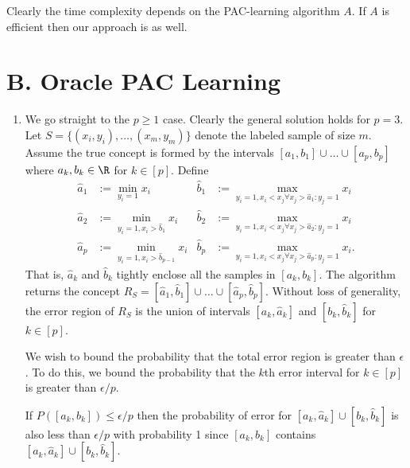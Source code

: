 Clearly the time complexity depends on the PAC-learning
algorithm $A$.
If $A$ is efficient then our approach is as well.

\medskip
\section*{B. Oracle PAC Learning}
\medskip

\begin{enumerate}
    \item We go straight to the $p\geq 1$ case.
    Clearly the general solution holds for $p=3$.
    Let $S=\{(x_i,y_i), \dots, (x_m,y_m)\}$
    denote the labeled sample of size $m$.
    Assume the true concept is formed
    by the intervals 
    $[a_1,b_1] \cup \dots \cup [a_p, b_p]$
    where $a_k, b_k \in \R$ for $k \in [p]$.
    Define
    \begin{align}
        \hat{a}_1 &:= \min_{y_i=1} x_i
        & 
        \hat{b}_1 &:= \max_
        {y_i=1, x_i < x_j \forall x_j > \hat{a}_1 : y_j=1} x_i
        \nonumber \\
        \hat{a}_2 &:= \min_{y_i=1, x_i > \hat{b}_1} x_i
        &
        \hat{b}_2 &:= \max_
        {y_i=1, x_i < x_j \forall x_j > \hat{a}_2 : y_j=1} x_i
        \nonumber \\
        \hat{a}_p &:= \min_{y_i=1, x_i > \hat{b}_{p-1}} x_i
        &
        \hat{b}_p &:= \max_
        {y_i=1, x_i < x_j \forall x_j > \hat{a}_p : y_j=1} x_i
        \nonumber.
    \end{align}
    That is,
    $\hat{a}_k$ and $\hat{b}_k$ tightly
    enclose all the samples in $[a_k, b_k]$.
    The algorithm returns the concept
    $R_S = [\hat{a}_1,\hat{b}_1] \cup 
    \dots \cup 
    [\hat{a}_p,\hat{b}_p]$.
    Without loss of generality,
    the error region of $R_S$
    is the union of intervals $[a_k, \hat{a}_k]$ 
    and $[b_k, \hat{b}_k]$ for $k \in [p]$.

    We wish to bound the probability that the
    total error region is greater than $\epsilon$.
    To do this, we bound the probability 
    that the $k$th error interval for $k \in [p]$
    is greater than $\epsilon/p$.

    If $P([a_k,b_k]) \leq \epsilon/p$
    then the probability of error
    for $[a_k, \hat{a}_k] \cup [b_k, \hat{b}_k]$
    is also less than $\epsilon/p$ with probability 1 since
    $[a_k, b_k]$ contains 
    $[a_k, \hat{a}_k] \cup [b_k, \hat{b}_k]$.


\end{enumerate}
